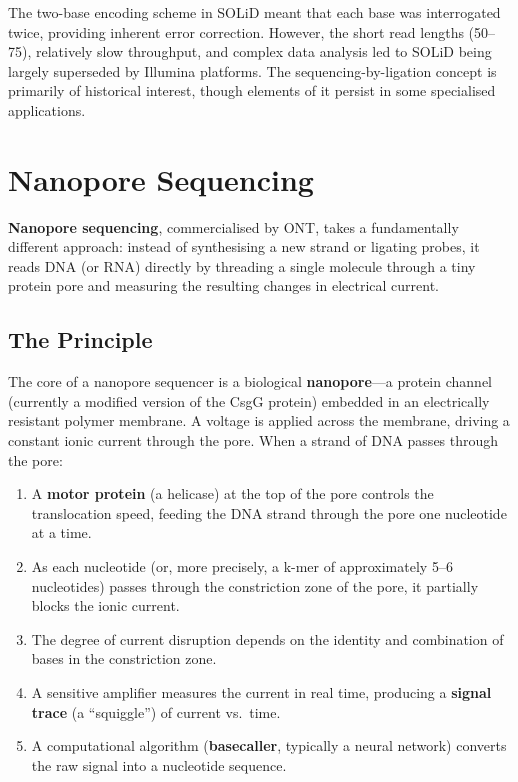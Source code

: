 The two-base encoding scheme in SOLiD meant that each base was interrogated twice, providing inherent error correction. However, the short read lengths (50--75\basepair{}), relatively slow throughput, and complex data analysis led to SOLiD being largely superseded by Illumina platforms. The sequencing-by-ligation concept is primarily of historical interest, though elements of it persist in some specialised applications.


\section{Nanopore Sequencing}
\label{sec:seqprinciples:nanopore}

\textbf{Nanopore sequencing}, commercialised by \acrfull{ONT}, takes a fundamentally different approach: instead of synthesising a new strand or ligating probes, it reads DNA (or RNA) directly by threading a single molecule through a tiny protein pore and measuring the resulting changes in electrical current.

\subsection{The Principle}
\label{subsec:seqprinciples:nanopore-principle}

The core of a nanopore sequencer is a biological \textbf{nanopore}---a protein channel (currently a modified version of the CsgG protein) embedded in an electrically resistant polymer membrane. A voltage is applied across the membrane, driving a constant ionic current through the pore. When a strand of DNA passes through the pore:

\begin{enumerate}[itemsep=2pt]
  \item A \textbf{motor protein} (a helicase) at the top of the pore controls the translocation speed, feeding the DNA strand through the pore one nucleotide at a time.
  \item As each nucleotide (or, more precisely, a k-mer of approximately 5--6 nucleotides) passes through the constriction zone of the pore, it partially blocks the ionic current.
  \item The degree of current disruption depends on the identity and combination of bases in the constriction zone.
  \item A sensitive amplifier measures the current in real time, producing a \textbf{signal trace} (a ``squiggle'') of current vs.\ time.
  \item A computational algorithm (\textbf{basecaller}, typically a neural network) converts the raw signal into a nucleotide sequence.
\end{enumerate}

